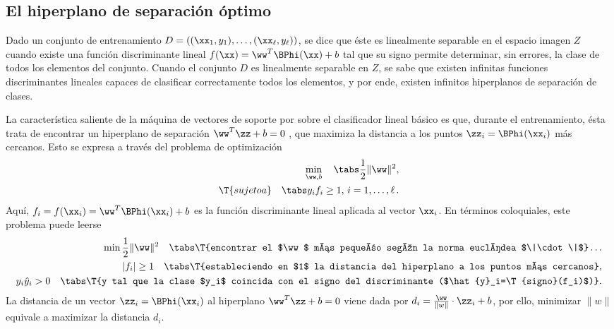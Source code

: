 %
%
\subsection{El hiperplano de separación óptimo}
%
Dado un conjunto de entrenamiento
$D=\left((\xx_1,y_1),\ldots,(\xx_\ell,y_\ell)\right)$, se dice que
éste es linealmente separable en el espacio imagen $Z$ cuando existe
una función discriminante lineal $f(\xx)=\ww^T\BPhi(\xx)+b$ tal que su
signo permite determinar, sin errores, la clase de todos los elementos
del conjunto.
Cuando el conjunto $D$ es linealmente separable en $Z$, se sabe que
existen infinitas funciones discriminantes lineales capaces de
clasificar correctamente todos los elementos, y por ende, existen
infinitos hiperplanos de separación de clases.

La característica saliente de la máquina de vectores de soporte por
sobre el clasificador lineal básico es que, durante el entrenamiento,
ésta trata de encontrar un hiperplano de separación $\ww^T\zz+b=0$
, que maximiza la distancia a los puntos
$\zz_i=\BPhi(\xx_i)$ más cercanos. Esto se expresa a través del
problema de optimización
%
\begin{align}
  \begin{split}
    \min_{\ww,b} \quad\tabs \frac{1}{2}\|\ww\|^2, \\
    \T{sujeto a}\quad\tabs y_i f_i\geq1,\,i=1,\ldots,\ell\,.
  \end{split}
  \label{e2:svm-problem-basic}
\end{align}
%
Aquí, $f_i=f(\xx_i)=\ww^T\BPhi(\xx_i)+b$ es la función discriminante
lineal aplicada al vector $\xx_i$. En términos coloquiales, este
problema puede leerse
%
\begin{align*}
  \begin{split}
    \min \frac{1}{2}\|\ww\|^2 \quad \tabs \T{encontrar el $\ww$ más
      pequeño según la norma euclídea $\|\cdot\|$}\ldots\\
    |f_i|\geq1 \quad \tabs \T{estableciendo en $1$ la distancia del
      hiperplano a los puntos más cercanos},\\
    y_i\hat{y}_i>0\quad \tabs \T{y tal que la clase $y_i$ coincida con el
      signo del discriminante ($\hat{y}_i=\T{signo}(f_i)$)}.
  \end{split}
\end{align*}
%
La distancia de un vector $\zz_i=\BPhi(\xx_i)$ al hiperplano
$\ww^T\zz+b=0$ viene dada por $d_i=\frac{\ww}{\|w\|}\cdot\zz_i+b$, por
ello, minimizar $\|w\|$ equivale a maximizar la distancia $d_i$.

